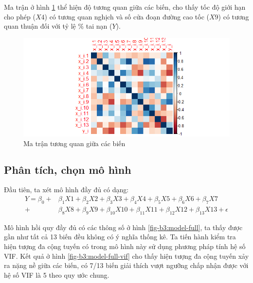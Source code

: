 Ma trận ở hình \ref{fig-b3:dataset-corr} thể hiện độ tương quan giữa các biến, cho thấy tốc độ giới hạn cho phép ($X4$) có tương quan nghịch và số cửa đoạn đường cao tốc ($X9$) có tương quan thuận đối với tỷ lệ \% tai nạn ($Y$).
\begin{figure}[H]
	\centering
	\includegraphics[width=0.85\linewidth]{images/B3/dataset-corr}
	\caption{Ma trận tương quan giữa các biến}
	\label{fig-b3:dataset-corr}
\end{figure}

\subsection*{Phân tích, chọn mô hình}

Đầu tiên, ta xét mô hình đầy đủ có dạng:
\begin{equation}\label{b3-model-full}
	\begin{split}
		Y = \beta_0 + &\beta_1X1 + \beta_2X2 + \beta_3X3 + \beta_4X4 + \beta_5X5 + \beta_6X6 + \beta_7X7\\ + &\beta_8X8 + \beta_9X9 + \beta_{10}X10 + \beta_{11}X11 + \beta_{12}X12 + \beta_{13}X13 + \epsilon
	\end{split}
\end{equation}

Mô hình hồi quy đầy đủ có các thông số ở hình \ref{fig-b3:model-full}, ta thấy được gần như tất cả 13 biến đều không có ý nghĩa thống kê. Ta tiến hành kiểm tra hiện tượng đa cộng tuyến có trong mô hình này sử dụng phương pháp tính hệ số VIF. Kết quả ở hình \ref{fig-b3:model-full-vif} cho thấy hiện tượng đa cộng tuyến xảy ra nặng nề giữa các biến, có 7/13 biến giải thích vượt ngưỡng chấp nhận được với hệ số VIF là 5 theo quy ước chung.


